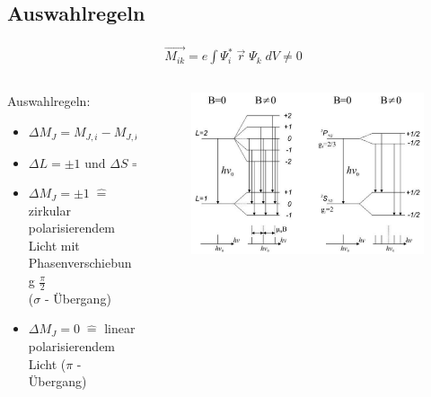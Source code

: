     \subsection{Auswahlregeln}
        \begin{myframe}{\subsecname}
                \vspace{-.7cm}
                \begin{align*}
                    \vec{M_{ik}} = e \int \Psi_i^* \; \vec{r} \; \Psi_k \; dV \neq 0
                \end{align*}
                \vspace{-.3cm}
                \begin{columns}
                    \begin{column}{0.48\textwidth}
                    Auswahlregeln:
                        \begin{itemize}
                            \item $\Delta M_J = M_{J,i} - M_{J,k} = 0, \pm 1 $
                            \item $\Delta L = \pm 1 \text{ und } \Delta S = 0 $
                            \item $\Delta M_J = \pm 1 \; \widehat{=}$ zirkular polarisierendem Licht mit Phasenverschiebung $\frac{\pi}{2}$ \\ ($\sigma$ - Übergang)
                            \item $\Delta M_J = 0 \; \widehat{=}$ linear polarisierendem Licht ($\pi$ - Übergang)
                        \end{itemize}
                    \end{column}
                    \begin{column}{0.48\textwidth}
                        \begin{figure}
                            \includegraphics[width=0.8\linewidth]{img/zeemanSplittingScheme.png}

\end{figure}
\end{column}
\end{columns}
\end{myframe}
